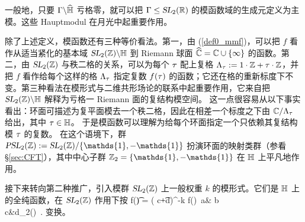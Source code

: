一般地，只要 $\Gamma\backslash \widehat{\mathbb{H}}$ 亏格零，就可以把 $\Gamma\leq \operatorname{\textsl{SL}}_2(\mathbb{R})$ 的模函数域的生成元定义为主模。这些 Hauptmodul 在月光中起重要作用。


除了上述定义，模函数还有三种等价看法。第一，由 (\ref{def0_mmf})，可以把 $f$ 看作从适当紧化的基本域 $\operatorname{\textsl{SL}}_2(\mathbb{Z}) \backslash \mathbb{H}$ 到 Riemann 球面 $\widehat{\mathbb{C}}=\mathbb{C}\cup \{\infty\}$ 的函数。第二，由 $\operatorname{\textsl{SL}}_2(\mathbb{Z})$ 与秩二格的关系，可以为每个 $\tau$ 配上复格 $\Lambda_\tau :=1\cdot \mathbb{Z}+\tau\cdot \mathbb{Z}$，并把 $f$ 看作给每个这样的格 $\Lambda_\tau$ 指定复数 $f(\tau)$ 的函数；它还在格的重新标度下不变。第三种看法在模形式与二维共形场论的联系中起重要作用，它来自把 $\operatorname{\textsl{SL}}_2(\mathbb{Z})\backslash \mathbb{H}$ 解释为亏格一 Riemann 面的复结构模空间。
这一点很容易从以下事实看出：环面可描述为复平面模去一个秩二格，因此在相差一个标度之下由 $\mathbb{C}/\Lambda_\tau$ 给出，其中 $\tau\in \mathbb{H}$。
于是模函数可以理解为给每个环面指定一个只依赖其复结构模 $\tau$ 的复数。
在这个语境下，群 $\PSL_2(\Z) := \SL_2(\Z)/\{{\mathds{1}},-{\mathds{1}}\}$ 扮演环面的映射类群（参看 \S\ref{sec:CFT}），其中中心子群 $\Z_2=\{{\mathds{1}},-{\mathds{1}}\}$ 在 $\mathbb{H}$ 上平凡地作用。


接下来转向第二种推广，引入模群 $\operatorname{\textsl{SL}}_2(\mathbb{Z})$ 上一般权重 $k$ 的模形式。它们是 $\mathbb{H}$ 上的全纯函数，在 $\operatorname{\textsl{SL}}_2(\mathbb{Z})$ 作用下按
\be\label{def1_mmf}
f(\t)  =  ( c\t+d)^{-k} f\left(\right)\quad \forall~\bem a& b\\ c&d\eem \in \SL_2(\Z)~.
\ee
变换。


